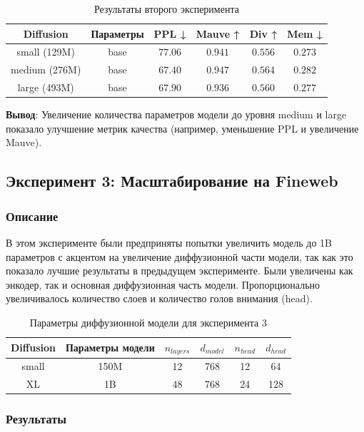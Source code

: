 \documentclass[a4paper, 12pt]{article}
\begin{document}
\begin{table}[h!]
\caption{Результаты второго эксперимента}
\centering
\begin{tabular}{|c|c|c|c|c|c|}
\hline
\textbf{Diffusion} & \textbf{Параметры} & PPL ↓ & Mauve ↑ & Div ↑ & Mem ↓ \\ \hline
small (129M) & base & $77.06$ & $0.941$ & $0.556$ & $0.273$ \\ \hline
medium (276M) & base & $67.40$ & $0.947$ & $0.564$ & $0.282$ \\ \hline
large (493M) & base & $67.90$ & $0.936$ & $0.560$ & $0.277$ \\ \hline
\end{tabular}
\end{table}


\textbf{Вывод}: Увеличение количества параметров модели до уровня medium и large показало улучшение метрик качества (например, уменьшение PPL и увеличение Mauve).

\subsection{Эксперимент 3: Масштабирование на Fineweb}

\subsubsection{Описание}
В этом эксперименте были предприняты попытки увеличить модель до 1B параметров с акцентом на увеличение диффузионной части модели, так как это показало лучшие результаты в предыдущем эксперименте. Были увеличены как энкодер, так и основная диффузионная часть модели. Пропорционально увеличивалось количество слоев и количество голов внимания (head).

\begin{table}[h!]
\caption{Параметры диффузионной модели для эксперимента 3}
\centering
\begin{tabular}{|c|c|c|c|c|c|}
\hline
\textbf{Diffusion} & \textbf{Параметры модели} & $n_{layers}$ & $d_{model}$ & $n_{head}$ & $d_{head}$ \\ \hline
small & 150M & 12 & 768 & 12 & 64 \\ \hline
XL & 1B & 48 & 768 & 24 & 128 \\ \hline
\end{tabular}
\end{table}

\subsubsection{Результаты}
\end{document}

